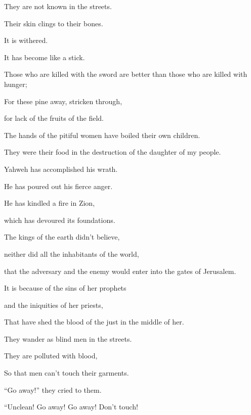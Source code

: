 {\par }{\QB They are not known in the streets.
\par }{\Q Their skin clings to their bones.
\par }{\QB It is withered.
\par }{\QB It has become like a stick.
\par }{\BB \par }{\Q {}Those who are killed with the sword are better than those who are killed with hunger;
\par }{\QB For these pine away, stricken through,
\par }{\QB for lack of the fruits of the field.
\par }{\BB \par }{\Q {}The hands of the pitiful women have boiled their own children.
\par }{\QB They were their food in the destruction of the daughter of my people.
\par }{\BB \par }{\Q {}Yahweh has accomplished his wrath.
\par }{\QB He has poured out his fierce anger.
\par }{\Q He has kindled a fire in Zion,
\par }{\QB which has devoured its foundations.
\par }{\BB \par }{\Q {}The kings of the earth didn’t believe,
\par }{\QB neither did all the inhabitants of the world,
\par }{\QB that the adversary and the enemy would enter into the gates of Jerusalem.
\par }{\BB \par }{\Q {}It is because of the sins of her prophets
\par }{\QB and the iniquities of her priests,
\par }{\QB That have shed the blood of the just in the middle of her.
\par }{\BB \par }{\Q {}They wander as blind men in the streets.
\par }{\QB They are polluted with blood,
\par }{\QB So that men can’t touch their garments.
\par }{\BB \par }{\Q {}“Go away!” they cried to them.
\par }{\QB “Unclean! Go away! Go away! Don’t touch!
}
